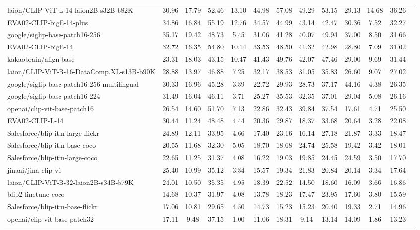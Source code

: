 \begin{table*}
{\begin{tabular}{lcccccccccccc}
laion/CLIP-ViT-L-14-laion2B-s32B-b82K &30.96 &17.79 &52.46 &13.10 &44.98 &57.08 &49.29 &53.15 &29.13 &14.68 &36.26 \\
EVA02-CLIP-bigE-14-plus &34.86 &16.84 &55.19 &12.76 &34.57 &44.99 &43.14 &42.47 &30.36 &7.52 &32.27 \\
google/siglip-base-patch16-256 &35.17 &19.42 &48.73 &5.45 &31.06 &41.28 &40.07 &49.94 &37.00 &8.50 &31.66 \\
EVA02-CLIP-bigE-14 &32.72 &16.35 &54.80 &10.14 &33.53 &48.50 &41.32 &42.98 &28.80 &7.09 &31.62 \\
kakaobrain/align-base &23.31 &18.03 &43.15 &10.47 &41.43 &49.76 &42.07 &47.46 &29.00 &9.69 &31.44 \\
laion/CLIP-ViT-B-16-DataComp.XL-s13B-b90K &28.88 &13.97 &46.88 &7.25 &32.17 &38.53 &31.05 &35.83 &26.60 &9.07 &27.02 \\
google/siglip-base-patch16-256-multilingual &30.33 &16.96 &45.28 &3.89 &22.72 &29.93 &28.73 &37.17 &44.16 &4.38 &26.35 \\
google/siglip-base-patch16-224 &31.49 &16.04 &46.11 &3.71 &25.27 &35.53 &32.35 &37.01 &29.04 &5.08 &26.16 \\
openai/clip-vit-base-patch16 &26.54 &14.60 &51.70 &7.13 &22.86 &32.43 &39.84 &37.54 &17.61 &4.71 &25.50 \\
EVA02-CLIP-L-14 &30.44 &11.24 &48.48 &4.44 &20.36 &29.87 &18.37 &33.68 &20.64 &3.28 &22.08 \\
Salesforce/blip-itm-large-flickr &24.89 &12.11 &33.95 &4.66 &17.40 &23.16 &16.14 &27.18 &21.87 &3.33 &18.47 \\
Salesforce/blip-itm-base-coco &20.55 &11.68 &32.30 &5.05 &18.70 &18.68 &24.74 &25.58 &19.42 &3.42 &18.01 \\
Salesforce/blip-itm-large-coco &22.65 &11.25 &31.37 &4.08 &16.22 &19.03 &19.85 &24.45 &24.59 &3.50 &17.70 \\
jinaai/jina-clip-v1 &25.40 &10.99 &35.12 &3.84 &15.57 &19.34 &21.83 &20.84 &20.14 &3.34 &17.64 \\
laion/CLIP-ViT-B-32-laion2B-s34B-b79K &24.01 &10.50 &35.35 &4.95 &18.39 &22.52 &14.50 &18.60 &16.09 &3.66 &16.86 \\
blip2-finetune-coco &14.68 &10.37 &31.97 &4.08 &13.78 &18.23 &17.47 &23.95 &17.60 &3.80 &15.59 \\
Salesforce/blip-itm-base-flickr &17.06 &10.81 &29.65 &4.50 &14.73 &15.23 &15.23 &20.40 &19.33 &2.71 &14.96 \\
openai/clip-vit-base-patch32 &17.11 &9.48 &37.15 &1.00 &11.06 &18.31 &9.14 &13.14 &14.09 &1.86 &13.23 \\

\end{tabular}}
\end{table*}
